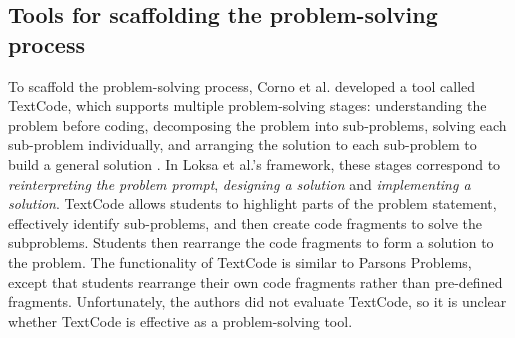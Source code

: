 \documentclass[sigconf,authorversion,nonacm]{acmart}
\begin{document}
\subsection{Tools for scaffolding the problem-solving process}
To scaffold the problem-solving process, Corno et al. developed a tool called TextCode, which supports multiple problem-solving stages: understanding the problem before coding, decomposing the problem into sub-problems, solving each sub-problem individually, and arranging the solution to each sub-problem to build a general solution \cite{corno2021}. In Loksa et al.'s framework, these stages correspond to \emph{reinterpreting the problem prompt}, \emph{designing a solution} and \emph{implementing a solution}. TextCode allows students to highlight parts of the problem statement, effectively identify sub-problems, and then create code fragments to solve the subproblems. Students then rearrange the code fragments to form a solution to the problem. The functionality of TextCode is similar to Parsons Problems, except that students rearrange their own code fragments rather than pre-defined fragments. Unfortunately, the authors did not evaluate TextCode, so it is unclear whether TextCode is effective as a problem-solving tool.
\end{document}
